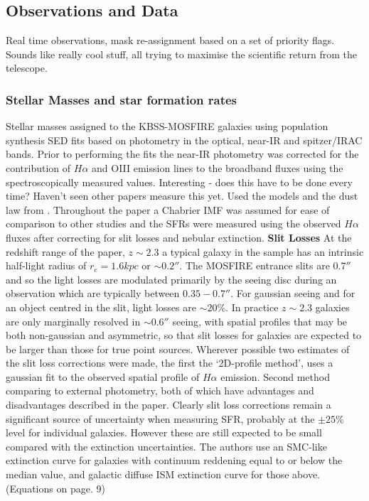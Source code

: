 \documentclass{literature}
\begin{document}
\subsection{Observations and Data}
Real time observations, mask re-assignment based on a set of priority flags. Sounds like really cool stuff, all trying to maximise the scientific return from the telescope. 

\subsubsection{Stellar Masses and star formation rates}
Stellar masses assigned to the KBSS-MOSFIRE galaxies using population synthesis SED fits based on photometry in the optical, near-IR and spitzer/IRAC bands. Prior to performing the fits the near-IR photometry was corrected for the contribution of $H\alpha$ and OIII emission lines to the broadband fluxes using the spectroscopically measured values. Interesting - does this have to be done every time? Haven't seen other papers measure this yet. Used the \citep{Bruzual2003} models and the dust law from \citep{Calzetti2000}. Throughout the paper a Chabrier \citep{Chabrier2003} IMF was assumed for ease of comparison to other studies and the SFRs were measured using the observed $H\alpha$ fluxes after correcting for slit losses and nebular extinction. \textbf{Slit Losses} At the redshift range of the paper, $z \sim 2.3$ a typical galaxy in the sample has an intrinsic half-light radius of $r_{e} = 1.6kpc$ or $\sim 0.2''$. The MOSFIRE entrance slits are $0.7''$ and so the light losses are modulated primarily by the seeing disc during an observation which are typically between $0.35-0.7''$. For gaussian seeing and for an object centred in the slit, light losses are $\sim 20\%$. In practice $z\sim 2.3$ galaxies are only marginally resolved in $\sim 0.6''$ seeing, with spatial profiles that may be both non-gaussian and asymmetric, so that slit losses for galaxies are expected to be larger than those for true point sources. Wherever possible two estimates of the slit loss corrections were made, the first the `2D-profile method', uses a gaussian fit to the observed spatial profile of $H\alpha$ emission. Second method comparing to external photometry, both of which have advantages and disadvantages described in the paper. Clearly slit loss corrections remain a significant source of uncertainty when measuring SFR, probably at the $\pm 25 \%$ level for individual galaxies. However these are still expected to be small compared with the extinction uncertainties. The authors use an SMC-like extinction curve for galaxies with continuum reddening equal to or below the median value, and galactic diffuse ISM extinction curve for those above. (Equations on page. 9)
\end{document}
